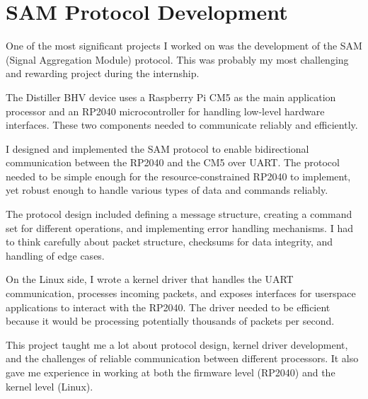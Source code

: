 \documentclass[12pt,a4paper]{report}
\begin{document}

\section{SAM Protocol Development}

One of the most significant projects I worked on was the development of the SAM (Signal Aggregation Module) protocol. This was probably my most challenging and rewarding project during the internship.

\vspace{0.3cm}

The Distiller BHV device uses a Raspberry Pi CM5 as the main application processor and an RP2040 microcontroller for handling low-level hardware interfaces. These two components needed to communicate reliably and efficiently.

\vspace{0.3cm}

I designed and implemented the SAM protocol to enable bidirectional communication between the RP2040 and the CM5 over UART. The protocol needed to be simple enough for the resource-constrained RP2040 to implement, yet robust enough to handle various types of data and commands reliably.

\vspace{0.3cm}

The protocol design included defining a message structure, creating a command set for different operations, and implementing error handling mechanisms. I had to think carefully about packet structure, checksums for data integrity, and handling of edge cases.

\vspace{0.3cm}

On the Linux side, I wrote a kernel driver that handles the UART communication, processes incoming packets, and exposes interfaces for userspace applications to interact with the RP2040. The driver needed to be efficient because it would be processing potentially thousands of packets per second.

\vspace{0.3cm}

This project taught me a lot about protocol design, kernel driver development, and the challenges of reliable communication between different processors. It also gave me experience in working at both the firmware level (RP2040) and the kernel level (Linux).
\end{document}
